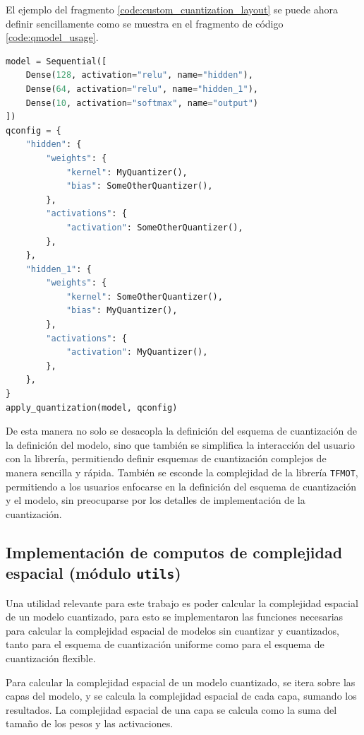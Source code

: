 El ejemplo del fragmento \ref{code:custom_cuantization_layout} se puede ahora definir sencillamente como se muestra en el fragmento de código \ref{code:qmodel_usage}.

\begin{lstlisting}[language=Python,label=code:qmodel_usage,caption=Uso del modulo qmodel para cuantizar un modelo a partir de una descripción de esquema de cuantización.]
model = Sequential([
    Dense(128, activation="relu", name="hidden"),
    Dense(64, activation="relu", name="hidden_1"),
    Dense(10, activation="softmax", name="output")
])
qconfig = {
    "hidden": {
        "weights": {
            "kernel": MyQuantizer(),
            "bias": SomeOtherQuantizer(),
        },
        "activations": {
            "activation": SomeOtherQuantizer(),
        },
    },
    "hidden_1": {
        "weights": {
            "kernel": SomeOtherQuantizer(),
            "bias": MyQuantizer(),
        },
        "activations": {
            "activation": MyQuantizer(),
        },
    },
}
apply_quantization(model, qconfig)
\end{lstlisting}

De esta manera no solo se desacopla la definición del esquema de cuantización de la definición del modelo, sino que también se simplifica la interacción del usuario con la librería, permitiendo definir esquemas de cuantización complejos de manera sencilla y rápida. También se esconde la complejidad de la librería \texttt{TFMOT}, permitiendo a los usuarios enfocarse en la definición del esquema de cuantización y el modelo, sin preocuparse por los detalles de implementación de la cuantización.


\subsection{Implementación de computos de complejidad espacial (módulo \texttt{utils})}
Una utilidad relevante para este trabajo es poder calcular la complejidad espacial de un modelo cuantizado, para esto se implementaron las funciones necesarias para calcular la complejidad espacial de modelos sin cuantizar y cuantizados, tanto para el esquema de cuantización uniforme como para el esquema de cuantización flexible.

Para calcular la complejidad espacial de un modelo cuantizado, se itera sobre las capas del modelo, y se calcula la complejidad espacial de cada capa, sumando los resultados. La complejidad espacial de una capa se calcula como la suma del tamaño de los pesos y las activaciones.

